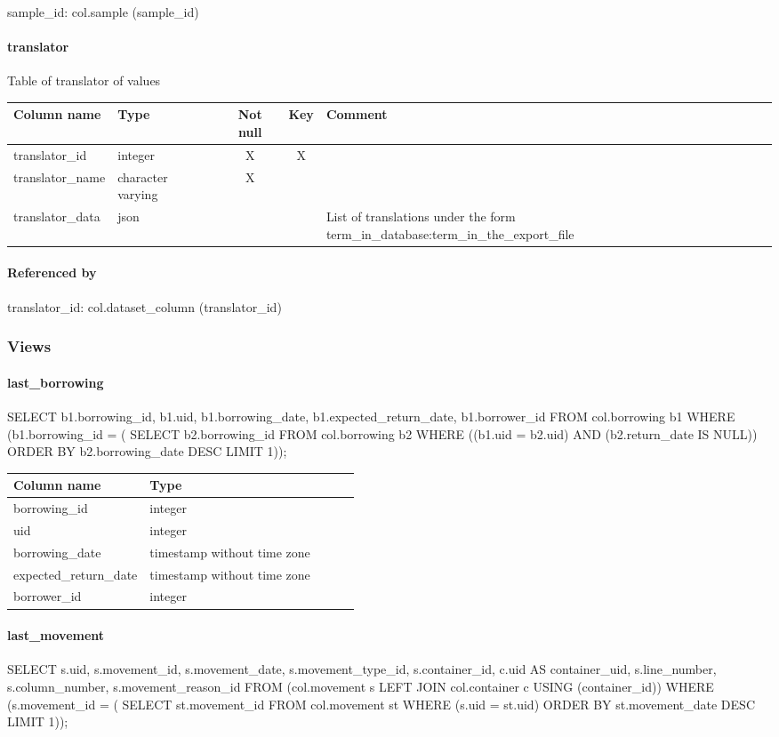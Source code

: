sample\_id: col.sample (sample\_id)

\paragraph{translator}
Table of translator of values

\begin{tabular}{|l| p{2cm}|c|c| p{5cm}|}
\hline
Column name & Type & Not null & Key & Comment \\
\hline
translator\_id & integer & X & X & \\
translator\_name & character varying & X &  & \\
translator\_data & json &  &  & List of translations under the form term\_in\_database:term\_in\_the\_export\_file\\
\hline
\end{tabular}
\paragraph{Referenced by}
translator\_id: col.dataset\_column (translator\_id)

\subsubsection{Views}
\paragraph{last\_borrowing}
 SELECT b1.borrowing\_id,
    b1.uid,
    b1.borrowing\_date,
    b1.expected\_return\_date,
    b1.borrower\_id
   FROM col.borrowing b1
  WHERE (b1.borrowing\_id = ( SELECT b2.borrowing\_id
           FROM col.borrowing b2
          WHERE ((b1.uid = b2.uid) AND (b2.return\_date IS NULL))
          ORDER BY b2.borrowing\_date DESC
         LIMIT 1));

\begin{tabular}{|l| p{2cm}|c|c| p{5cm}|}
\hline
Column name & Type \\
\hline
borrowing\_id & integer\\
uid & integer\\
borrowing\_date & timestamp without time zone\\
expected\_return\_date & timestamp without time zone\\
borrower\_id & integer\\
\hline
\end{tabular}
\paragraph{last\_movement}
 SELECT s.uid,
    s.movement\_id,
    s.movement\_date,
    s.movement\_type\_id,
    s.container\_id,
    c.uid AS container\_uid,
    s.line\_number,
    s.column\_number,
    s.movement\_reason\_id
   FROM (col.movement s
     LEFT JOIN col.container c USING (container\_id))
  WHERE (s.movement\_id = ( SELECT st.movement\_id
           FROM col.movement st
          WHERE (s.uid = st.uid)
          ORDER BY st.movement\_date DESC
         LIMIT 1));

